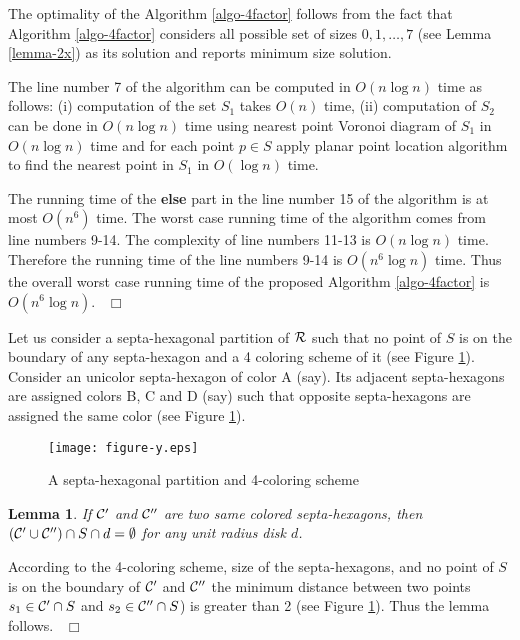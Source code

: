 \documentclass[a4paper,11pt]{article}
\newtheorem{lemma}{Lemma}
\newenvironment{proof}{\noindent {\bf Proof:\,\ }}{\hfill\mbox{\
$\Box$}\smallskip}
\begin{document}
\begin{proof}
 The optimality of the Algorithm \ref{algo-4factor} follows from the fact that Algorithm \ref{algo-4factor} 
 considers all possible set of sizes $0, 1, \ldots, 7$ (see Lemma \ref{lemma-2x}) as its solution and 
 reports minimum size solution.
 
 The line number 7 of the algorithm can be computed in $O(n \log n)$ time as follows: (i) computation of the set 
 $S_1$ takes $O(n)$ time, (ii) computation of $S_2$ can be done in $O(n \log n)$ time using nearest 
 point Voronoi diagram of $S_1$ in $O(n \log n)$ time and for each point $p \in S$ apply planar point 
 location algorithm to find the nearest point in $S_1$ in $O(\log n)$ time.
 
 The running time of the {\bf else} part in the line number 15 of the algorithm is at most $O(n^6)$ time. 
 The worst case running time of the algorithm comes from line numbers 9-14. The complexity of line numbers 11-13 
 is $O(n \log n)$ time. Therefore the running time of the line numbers 9-14 is $O(n^6 \log n)$ time. 
 Thus the overall worst case running time of the proposed Algorithm \ref{algo-4factor} is $O(n^6 \log n)$.
\end{proof}


Let us consider a septa-hexagonal partition of ${\cal R}$ such that no point of $S$ is on the boundary of 
any septa-hexagon and a 4 coloring scheme of it (see Figure \ref{fig:fig10}). Consider an unicolor 
septa-hexagon of color A (say). Its adjacent septa-hexagons are assigned colors B, C and D (say) such 
that opposite septa-hexagons are assigned the same color (see Figure \ref{fig:fig10}).  

\begin{figure}[ht]
\begin{center}
\texttt{[image: figure-y.eps]}
\caption{A septa-hexagonal partition and 4-coloring scheme}
\label{fig:fig10}
\end{center}
\end{figure}

\vspace{-0.1in}
\begin{lemma} \label{lemma-4x}
 If ${\cal C}'$ and ${\cal C}''$ are two same colored septa-hexagons, then 
 $({\cal C}' \cup {\cal C}'') \cap S \cap d = \emptyset$ for any unit radius disk $d$.
\end{lemma}

\begin{proof}
According to the 4-coloring scheme, size of the septa-hexagons, and no point of $S$ is on the boundary 
of ${\cal C}'$ and ${\cal C}''$ the minimum distance between two points $s_1 \in {\cal C}' \cap S$ 
and $s_2 \in {\cal C}''\cap S$) is greater than 2 (see Figure \ref{fig:fig10}). Thus the lemma follows.
\end{proof}
\end{document}
